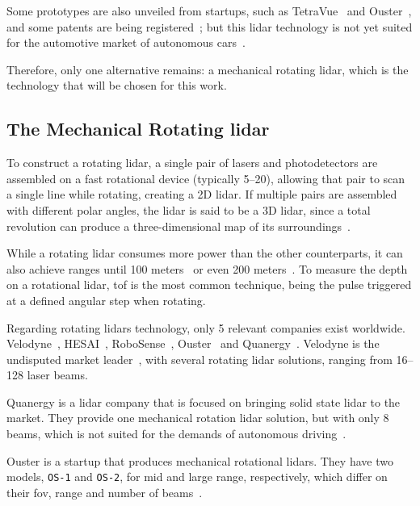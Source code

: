 Some prototypes are also unveiled from startups, such as TetraVue~\cite{TetraVue} and Ouster~\cite{Ouster}, and some patents are being registered~\cite{Simpson2019}; but this \ac{lidar} technology is not yet suited for the automotive market of autonomous cars~\cite{Fersch2017a}.

Therefore, only one alternative remains: a mechanical rotating \ac{lidar}, which is the technology that will be chosen for this work.

\subsection{The Mechanical Rotating \ac{lidar}}
To construct a rotating \ac{lidar}, a single pair of \acp{laser} and photodetectors are assembled on a fast rotational device (typically \SIrange{5}{20}{\revspersecond}), allowing that pair to scan a single line while rotating, creating a 2D \ac{lidar}. If multiple pairs are assembled with different polar angles, the \ac{lidar} is said to be a 3D \ac{lidar}, since a total revolution can produce a three-dimensional map of its surroundings~\cite{Sullivan2016}.

While a rotating \ac{lidar} consumes more power than the other counterparts, it can also achieve ranges until 100 meters~\cite{vlp16, Sullivan2016} or even 200 meters~\cite{VelodyneHDL64, Pandar40UserGuide, Sullivan2016}. To measure the depth on a rotational \ac{lidar}, \ac{tof} is the most common technique, being the pulse triggered at a defined angular step when rotating.

Regarding rotating \acp{lidar} technology, only 5 relevant companies exist worldwide. Velodyne\cp~\cite{Velodyne}, HESAI\cp~\cite{Hesai}, RoboSense\cp~\cite{Robosense}, Ouster\cp~\cite{Ouster} and Quanergy\cp~\cite{Quanergy}. Velodyne is the undisputed market leader~\cite{Sullivan2016, Hecht2018}, with several rotating \ac{lidar} solutions, ranging from \SIrange{16}{128}{} laser beams.

Quanergy is a \ac{lidar} company that is focused on bringing solid state \ac{lidar} to the market. They provide one mechanical rotation \ac{lidar} solution, but with only 8 beams, which is not suited for the demands of autonomous driving~\cite{Sullivan2016, Hecht2018}. 

Ouster is a startup that produces mechanical rotational \acp{lidar}. They have two models, \texttt{OS-1} and \texttt{OS-2}, for mid and large range, respectively, which differ on their \ac{fov}, range and number of beams~\cite{Ouster}.

